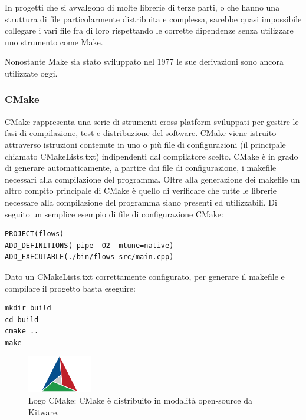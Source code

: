         In progetti che si avvalgono di molte librerie di terze parti, o che hanno una struttura di file particolarmente
        distribuita e complessa, sarebbe quasi impossibile collegare i vari file fra di loro rispettando
        le corrette dipendenze senza utilizzare uno strumento come Make.

        Nonostante Make sia stato sviluppato nel 1977 le sue derivazioni sono ancora utilizzate oggi.

        \subsubsection{CMake}\label{cmake}
        CMake rappresenta una serie di strumenti cross-platform sviluppati per gestire le fasi di compilazione, test e
        distribuzione del software. CMake viene istruito attraverso istruzioni contenute in uno o più file di configurazioni
        (il principale chiamato CMakeLists.txt) indipendenti dal compilatore scelto. CMake è in grado di generare automaticamente,
        a partire dai file di configurazione, i makefile necessari alla compilazione del programma. Oltre alla generazione
        dei makefile un altro compito principale di CMake è quello di verificare che tutte le librerie necessare alla
        compilazione del programma siano presenti ed utilizzabili.
        Di seguito un semplice esempio di file di configurazione CMake:
        \begin{verbatim}
PROJECT(flows)
ADD_DEFINITIONS(-pipe -O2 -mtune=native)
ADD_EXECUTABLE(./bin/flows src/main.cpp)
        \end{verbatim}
        Dato un CMakeLists.txt correttamente configurato, per generare il makefile e compilare il progetto basta eseguire:
        \begin{verbatim}
mkdir build
cd build
cmake ..
make
        \end{verbatim}
        
        \begin{figure}[H]
            \centering
            \includegraphics[width=0.25\textwidth]{figure/cmake_logo_slider.png}
            \caption{Logo CMake: CMake è distribuito in modalità open-source da Kitware.}
        \end{figure}

